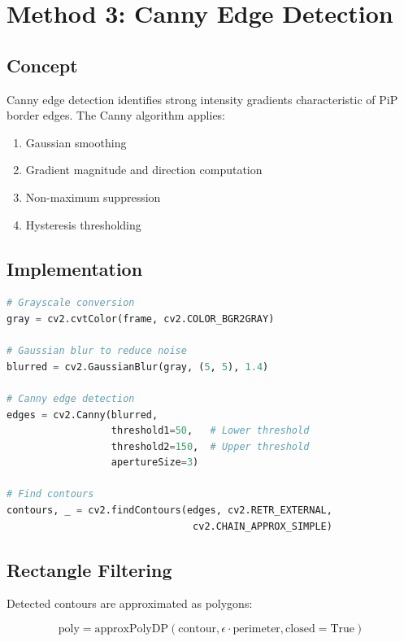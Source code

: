 \documentclass[11pt,a4paper]{article}
\begin{document}
\section{Method 3: Canny Edge Detection}

\subsection{Concept}

Canny edge detection identifies strong intensity gradients characteristic of PiP border edges. The Canny algorithm applies:

\begin{enumerate}
    \item Gaussian smoothing
    \item Gradient magnitude and direction computation
    \item Non-maximum suppression
    \item Hysteresis thresholding
\end{enumerate}

\subsection{Implementation}

\begin{lstlisting}[language=Python]
# Grayscale conversion
gray = cv2.cvtColor(frame, cv2.COLOR_BGR2GRAY)

# Gaussian blur to reduce noise
blurred = cv2.GaussianBlur(gray, (5, 5), 1.4)

# Canny edge detection
edges = cv2.Canny(blurred, 
                  threshold1=50,   # Lower threshold
                  threshold2=150,  # Upper threshold  
                  apertureSize=3)

# Find contours
contours, _ = cv2.findContours(edges, cv2.RETR_EXTERNAL, 
                                cv2.CHAIN_APPROX_SIMPLE)
\end{lstlisting}

\subsection{Rectangle Filtering}

Detected contours are approximated as polygons:

\begin{equation}
\text{poly} = \text{approxPolyDP}(\text{contour}, \epsilon \cdot \text{perimeter}, \text{closed}=\text{True})
\end{equation}
\end{document}
